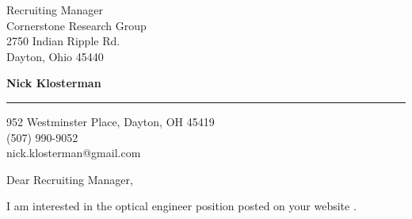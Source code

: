 \documentclass{letter} %
\makeatletter
\newcommand{\contactperson}{Recruiting Manager}
\newcommand{\contactCompany}{Cornerstone Research Group}
\newcommand{\contactStreetAddress}{2750 Indian Ripple Rd.}
\newcommand{\contactCityStateZip}{Dayton, Ohio 45440 }
\newcommand{\position}{optical engineer }%
\newcommand{\jobpostingsource}{ your website } %
\newcommand{\personalphonenumber}{(507) 990-9052}
\newcommand{\personalemail}{nick.klosterman@gmail.com}
\makeatother
\begin{document}
\signature{Nick Klosterman}           %
\longindentation=0pt                       %
\let\raggedleft\raggedright                %
 

 
\begin{letter}{\contactperson \\
\contactCompany \\
\contactStreetAddress \\
\contactCityStateZip

}

  \begin{flushright}
 \hfill   \large\bf Nick Klosterman  \\
\end{flushright}
\begin{flushright}
    \medskip\hrule height 1pt
    \hfill 952 Westminster Place, Dayton, OH 45419 \\
    \hfill \personalphonenumber \\
    \hfill \personalemail
  \end{flushright} 
\vfill %

 
\opening{Dear \contactperson,} 

\noindent 
I am interested in the \position position posted on \jobpostingsource. 


\end{letter}
\end{document}
